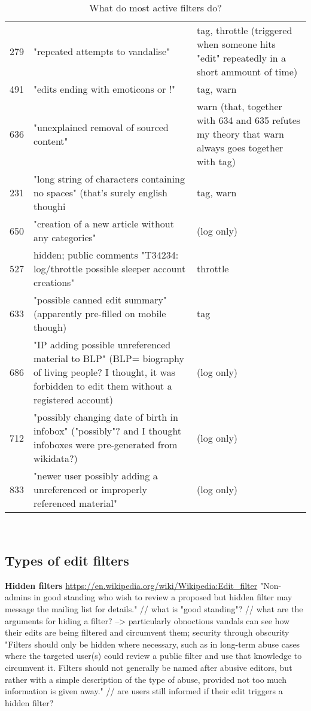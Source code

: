 \documentclass{sigchi}
\begin{document}
\begin{table*}
\begin{tabular}{r p{10cm} p{5cm} }
      279 & "repeated attempts to vandalise" & tag, throttle (triggered when someone hits "edit" repeatedly in a short ammount of time) \\
      491 & "edits ending with emoticons or !" & tag, warn \\
      636 & "unexplained removal of sourced content" & warn (that, together with 634 and 635 refutes my theory that warn always goes together with tag) \\
      231 & "long string of characters containing no spaces" (that's surely english though^^) & tag, warn \\
      650 & "creation of a new article without any categories" & (log only) \\
      527 & hidden; public comments "T34234: log/throttle possible sleeper account creations" & throttle \\
      633 & "possible canned edit summary" (apparently pre-filled on mobile though) & tag \\
      686 & "IP adding possible unreferenced material to BLP" (BLP= biography of living people? I thought, it was forbidden to edit them without a registered account) & (log only) \\
      712 & "possibly changing date of birth in infobox" ("possibly"? and I thought infoboxes were pre-generated from wikidata?) & (log only) \\
      833 & "newer user possibly adding a unreferenced or improperly referenced material" & (log only) \\
  \end{tabular}
  \caption{What do most active filters do?}~\label{tab:most-active-actions}
\end{table*}

\subsection{Types of edit filters}

\textbf{Hidden filters}
\url{https://en.wikipedia.org/wiki/Wikipedia:Edit_filter}
"Non-admins in good standing who wish to review a proposed but hidden filter may message the mailing list for details."
// what is "good standing"?
// what are the arguments for hiding a filter? --> particularly obnoctious vandals can see how their edits are being filtered and circumvent them; security through obscurity
"Filters should only be hidden where necessary, such as in long-term abuse cases where the targeted user(s) could review a public filter and use that knowledge to circumvent it. Filters should not generally be named after abusive editors, but rather with a simple description of the type of abuse, provided not too much information is given away."
// are users still informed if their edit triggers a hidden filter?
\end{document}
